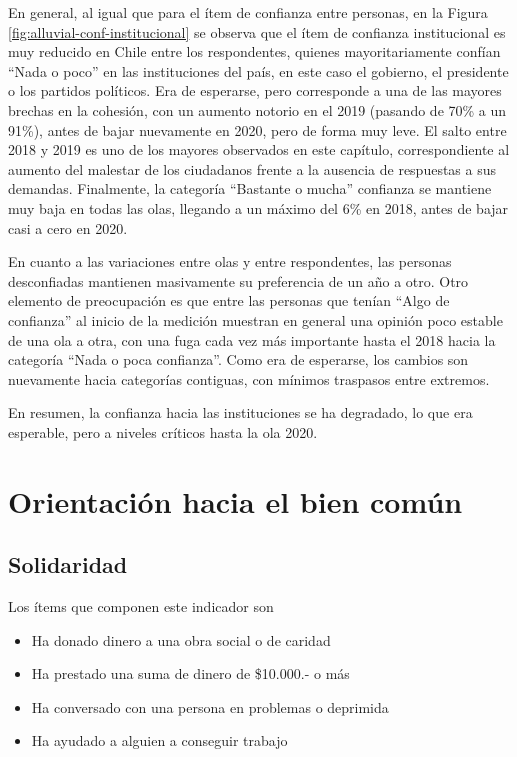 \documentclass[
  12pt,
]{book}
\begin{document}
En general, al igual que para el ítem de confianza entre personas, en la Figura \ref{fig:alluvial-conf-institucional} se observa que el ítem de confianza institucional es muy reducido en Chile entre los respondentes, quienes mayoritariamente confían ``Nada o poco'' en las instituciones del país, en este caso el gobierno, el presidente o los partidos políticos. Era de esperarse, pero corresponde a una de las mayores brechas en la cohesión, con un aumento notorio en el 2019 (pasando de 70\% a un 91\%), antes de bajar nuevamente en 2020, pero de forma muy leve. El salto entre 2018 y 2019 es uno de los mayores observados en este capítulo, correspondiente al aumento del malestar de los ciudadanos frente a la ausencia de respuestas a sus demandas. Finalmente, la categoría ``Bastante o mucha'' confianza se mantiene muy baja en todas las olas, llegando a un máximo del 6\% en 2018, antes de bajar casi a cero en 2020.

En cuanto a las variaciones entre olas y entre respondentes, las personas desconfiadas mantienen masivamente su preferencia de un año a otro. Otro elemento de preocupación es que entre las personas que tenían ``Algo de confianza'' al inicio de la medición muestran en general una opinión poco estable de una ola a otra, con una fuga cada vez más importante hasta el 2018 hacia la categoría ``Nada o poca confianza''. Como era de esperarse, los cambios son nuevamente hacia categorías contiguas, con mínimos traspasos entre extremos.

En resumen, la confianza hacia las instituciones se ha degradado, lo que era esperable, pero a niveles críticos hasta la ola 2020.

\hypertarget{orientaciuxf3n-hacia-el-bien-comuxfan-1}{%
\section{Orientación hacia el bien común}\label{orientaciuxf3n-hacia-el-bien-comuxfan-1}}

\hypertarget{solidaridad}{%
\subsection{Solidaridad}\label{solidaridad}}

Los ítems que componen este indicador son

\begin{itemize}
\item
  Ha donado dinero a una obra social o de caridad
\item
  Ha prestado una suma de dinero de \$10.000.- o más
\item
  Ha conversado con una persona en problemas o deprimida
\item
  Ha ayudado a alguien a conseguir trabajo
\end{itemize}
\end{document}

